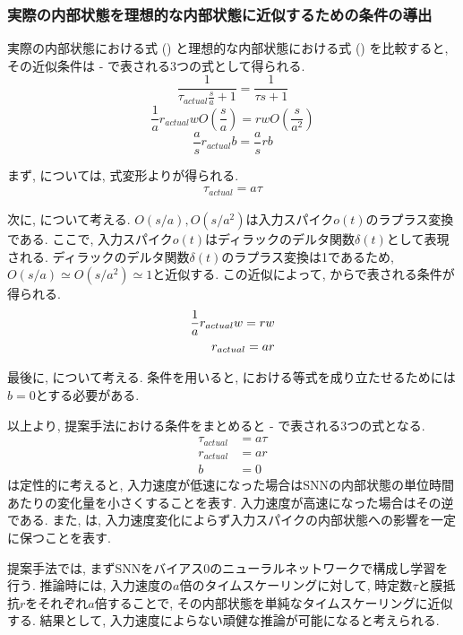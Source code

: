 \subsubsection{実際の内部状態を理想的な内部状態に近似するための条件の導出}
実際の内部状態における式 () と理想的な内部状態における式 () を比較すると, その近似条件は - で表される3つの式として得られる.
\begin{equation}
    \frac{1}{\tau_{actual} \frac{s}{a} +1} = \frac{1}{\tau s +1}  \label{eq:approximation:condition1}
\end{equation}
\begin{equation}
    \frac{1}{a} r_{actual} w O\left(\frac{s}{a}\right) = r w O\left(\frac{s}{a^2}\right) \label{eq:approximation:condition2}
\end{equation}
\begin{equation}
    \frac{a}{s} r_{actual} b = \frac{a}{s} r b \label{eq:approximation:condition3}
\end{equation}

まず, については, 式変形よりが得られる.
\begin{align}
    \tau_{actual} = a \tau \label{eq:approximation:condition1:result}
\end{align}

次に, について考える.
$O(s/a), O(s/a^2)$は入力スパイク$o(t)$のラプラス変換である.
ここで, 入力スパイク$o(t)$はディラックのデルタ関数$\delta(t)$として表現される.
ディラックのデルタ関数$\delta(t)$のラプラス変換は1であるため, $O(s/a) \simeq O(s/a^2) \simeq 1$と近似する.
この近似によって, からで表される条件が得られる.
\begin{align}
    \frac{1}{a} r_{actual} w = r w \notag \\
    r_{actual} = a r \label{eq:approximation:condition2:result}
\end{align}

最後に, について考える.
条件を用いると, における等式を成り立たせるためには$b=0$とする必要がある.

以上より, 提案手法における条件をまとめると - で表される3つの式となる.
\begin{align}
    \tau_{actual} &= a \tau \label{eq:approximation:condition1:result} \\
    r_{actual} &= a r \label{eq:approximation:condition2:result} \\
    b &= 0 \label{eq:approximation:condition3:result}
\end{align}
は定性的に考えると, 入力速度が低速になった場合はSNNの内部状態の単位時間あたりの変化量を小さくすることを表す.
入力速度が高速になった場合はその逆である.
また, は, 入力速度変化によらず入力スパイクの内部状態への影響を一定に保つことを表す.

提案手法では, まずSNNをバイアス0のニューラルネットワークで構成し学習を行う.
推論時には, 入力速度の$a$倍のタイムスケーリングに対して, 時定数$\tau$と膜抵抗$r$をそれぞれ$a$倍することで, その内部状態を単純なタイムスケーリングに近似する.
結果として, 入力速度によらない頑健な推論が可能になると考えられる.
